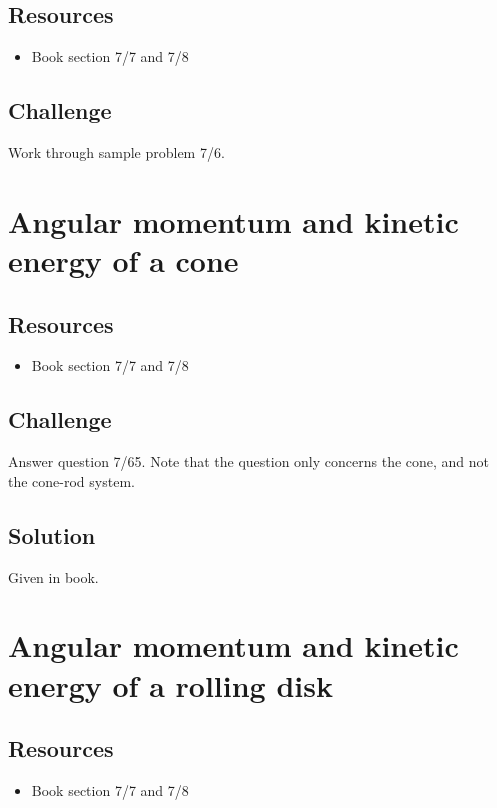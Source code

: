 \subsection*{Resources}
\begin{itemize}
    \item Book section 7/7 and 7/8
\end{itemize}

\subsection*{Challenge}
Work through sample problem 7/6.




\newpage
\section{Angular momentum and kinetic energy of a cone}

\subsection*{Resources}
\begin{itemize}
    \item Book section 7/7 and 7/8
\end{itemize}

\subsection*{Challenge}
Answer question 7/65. Note that the question only concerns the cone, and not the cone-rod system.

\subsection*{Solution}
Given in book.




\newpage
\section{Angular momentum and kinetic energy of a rolling disk}

\subsection*{Resources}
\begin{itemize}
    \item Book section 7/7 and 7/8
\end{itemize}

